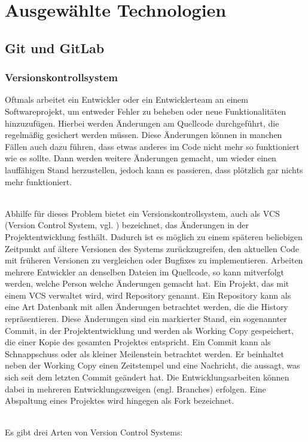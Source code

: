 \chapter{Ausgewählte Technologien}
\section{Git und GitLab}

\subsection{Versionskontrollsystem}
Oftmals arbeitet ein Entwickler oder ein Entwicklerteam an einem Softwareprojekt, um entweder Fehler zu beheben oder neue Funktionalitäten hinzuzufügen. Hierbei werden Änderungen am Quellcode durchgeführt, die regelmäßig gesichert werden müssen. Diese Änderungen können in manchen Fällen auch dazu führen, dass etwas anderes im Code nicht mehr so funktioniert wie es sollte. Dann werden weitere Änderungen gemacht, um wieder einen lauffähigen Stand herzustellen, jedoch kann es passieren, dass plötzlich gar nichts mehr funktioniert.

\mbox{}\\Abhilfe für dieses Problem bietet ein Versionskontrollsystem, auch als VCS (Version Control System, vgl. \cite{vcs_2019}) bezeichnet, das Änderungen in der Projektentwicklung festhält. Dadurch ist es möglich zu einem späteren beliebigen Zeitpunkt auf ältere Versionen des Systems zurückzugreifen, den aktuellen Code mit früheren Versionen zu vergleichen oder Bugfixes zu implementieren. Arbeiten mehrere Entwickler an denselben Dateien im Quellcode, so kann mitverfolgt werden, welche Person welche Änderungen gemacht hat. Ein Projekt, das mit einem VCS verwaltet wird, wird Repository genannt. Ein Repository kann als eine Art Datenbank mit allen Änderungen betrachtet werden, die die History repräsentieren. Diese Änderungen sind ein markierter Stand, ein sogenannter Commit, in der Projektentwicklung und werden als Working Copy gespeichert, die einer Kopie des gesamten Projektes entspricht. Ein Commit kann als Schnappschuss oder als kleiner Meilenstein betrachtet werden. Er beinhaltet neben der Working Copy einen Zeitstempel und eine Nachricht, die aussagt, was sich seit dem letzten Commit geändert hat. Die Entwicklungsarbeiten können dabei in mehreren Entwicklungszweigen (engl. Branches) erfolgen. Eine Abspaltung eines Projektes wird hingegen als Fork bezeichnet.

\mbox{}\\Es gibt drei Arten von Version Control Systems:

